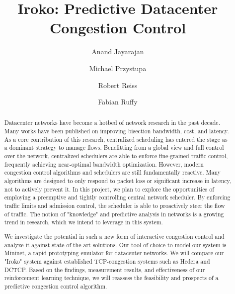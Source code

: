 \documentclass[sigconf]{acmart}
\begin{document}
\title{Iroko: Predictive Datacenter Congestion Control}

\author{Anand Jayarajan}

\author{Michael Przystupa}

\author{Robert Reiss}

\author{Fabian Ruffy}

\begin{abstract}
Datacenter networks have become a hotbed of network research in the past 
decade. Many works have been published on improving bisection bandwidth, cost, 
and latency. As a core contribution of this research, centralized scheduling 
has entered the stage as a dominant strategy to manage flows. Benefitting from 
a global view and full control over the network, centralized schedulers are 
able to enforce fine-grained traffic control, frequently achieving near-optimal 
bandwidth optimization. However, modern congestion control algorithms and 
schedulers are still fundamentally reactive. Many algorithms are designed to 
only respond to packet loss or significant increase in latency, not to actively 
prevent it.
In this project, we plan to explore the opportunities of employing a preemptive 
and tightly controlling central network scheduler. By enforcing traffic limits 
and admission control, the scheduler is able to proactively steer the flow of 
traffic. The notion of "knowledge" and predictive analysis in networks is a 
growing trend in research, which we intend to leverage in this system.

We investigate the potential in such a new form of interactive congestion 
control and analyze it against state-of-the-art solutions. Our tool of choice 
to model our system is Mininet, a rapid prototyping emulator for datacenter 
networks. We will compare our "Iroko" system against established TCP-congestion 
systems such as Hedera and DCTCP. Based on the findings, measurement results, 
and effectiveness of our reinforcement learning technique, we will reassess the 
feasibility and prospects of a predictive congestion control algorithm.
\end{abstract}





\maketitle













 
\end{document}

